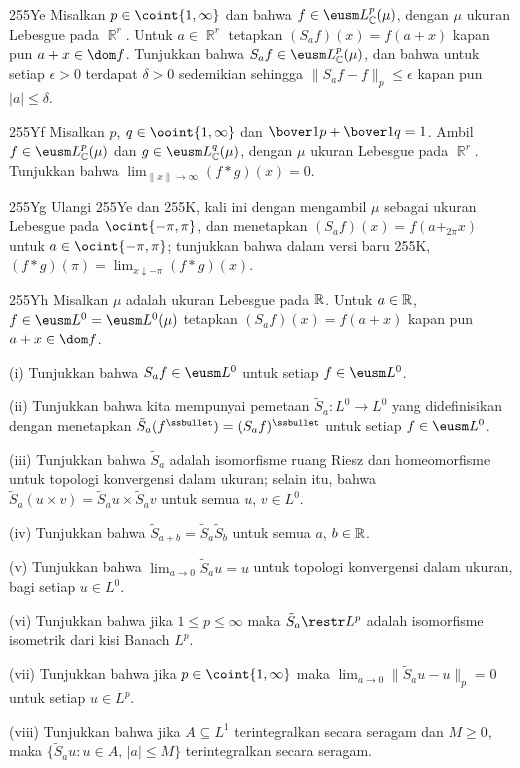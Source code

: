{\spheader 255Ye Misalkan $p\in\coint{1,\infty}$
dan bahwa $f\in\eusm L^p_{\Bbb C}(\mu)$, dengan $\mu$ ukuran Lebesgue
pada $\BbbR^r$.   Untuk $a\in\BbbR^r$ tetapkan $(S_af)(x)=f(a+x)$ kapan pun
$a+x\in\dom f$.   Tunjukkan bahwa $S_af\in\eusm L^p_{\Bbb C}(\mu)$, dan bahwa
untuk setiap $\epsilon>0$ terdapat $\delta>0$ sedemikian sehingga
$\|S_af-f\|_p\le\epsilon$ kapan pun $|a|\le\delta$.

\spheader 255Yf Misalkan $p$, $q\in\ooint{1,\infty}$ dan
$\bover1p+\bover1q=1$.   Ambil $f\in\eusm L^p_{\Bbb C}(\mu)$ dan
$g\in\eusm L^q_{\Bbb C}(\mu)$, dengan $\mu$ ukuran Lebesgue pada
$\BbbR^r$.   Tunjukkan bahwa $\lim_{\|x\|\to\infty}(f*g)(x)=0$.

\spheader 255Yg Ulangi 255Ye dan 255K, kali ini dengan mengambil $\mu$
sebagai ukuran Lebesgue pada $\ocint{-\pi,\pi}$, dan menetapkan
$(S_af)(x)=f(a+_{2\pi}x)$ untuk $a\in\ocint{-\pi,\pi}$;  tunjukkan bahwa dalam
versi baru 255K,
$(f*g)(\pi)=\lim_{x\downarrow -\pi}(f*g)(x)$.

\spheader 255Yh Misalkan $\mu$ adalah ukuran Lebesgue pada $\Bbb R$.   Untuk
$a\in\Bbb R$, $f\in\eusm L^0=\eusm L^0(\mu)$ tetapkan $(S_af)(x)=f(a+x)$
kapan pun $a+x\in\dom f$.

\quad (i) Tunjukkan bahwa $S_af\in\eusm L^0$ untuk setiap $f\in\eusm L^0$.

\quad  (ii) Tunjukkan bahwa kita mempunyai pemetaan $\tilde S_a:L^0\to L^0$ yang didefinisikan
dengan menetapkan $\tilde S_a(f^{\ssbullet})=(S_af)^{\ssbullet}$ untuk setiap
$f\in\eusm L^0$.

\quad  (iii) Tunjukkan bahwa $\tilde S_a$ adalah isomorfisme ruang Riesz dan
homeomorfisme untuk topologi konvergensi dalam ukuran;  selain itu,
bahwa $\tilde S_a(u\times v)=\tilde S_au\times\tilde S_av$ untuk semua $u$,
$v\in L^0$.

\quad  (iv) Tunjukkan bahwa $\tilde S_{a+b}=\tilde S_a\tilde S_b$ untuk semua $a$,
$b\in\Bbb R$.

\quad  (v) Tunjukkan bahwa $\lim_{a\to 0}\tilde S_au=u$ untuk topologi
konvergensi dalam ukuran, bagi setiap $u\in L^0$.

\quad  (vi) Tunjukkan bahwa jika $1\le p\le\infty$ maka $\tilde S_a\restr L^p$
adalah isomorfisme isometrik dari kisi Banach $L^p$.

\quad  (vii) Tunjukkan bahwa jika $p\in\coint{1,\infty}$ maka
$\lim_{a\to 0}\|\tilde S_au-u\|_p=0$ untuk setiap $u\in L^p$.

\quad  (viii) Tunjukkan bahwa jika $A\subseteq L^1$ terintegralkan secara seragam dan
$M\ge 0$, maka $\{\tilde S_au:u\in A,\,|a|\le M\}$ terintegralkan secara
seragam.

}
